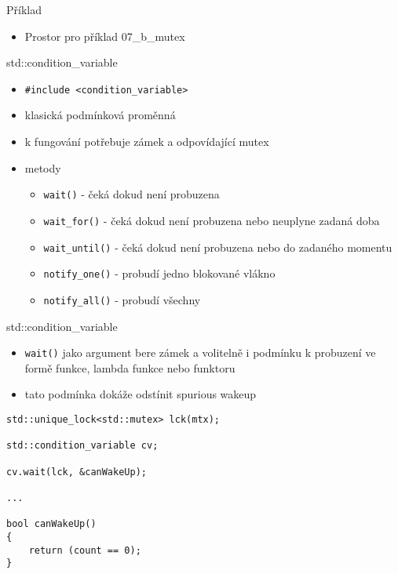 \documentclass{beamer}
\begin{document}
\begin{xframe}{Příklad}
	\begin{itemize}
		\item Prostor pro příklad 07\_b\_mutex
	\end{itemize}
\end{xframe}


\begin{xframe}{std::condition\_variable}
	\begin{itemize}
		\item \texttt{\#include <condition\_variable>}
		\item klasická podmínková proměnná
		\item k fungování potřebuje zámek a odpovídající mutex
		\item metody
			\begin{itemize}
				\item \texttt{wait()} - čeká dokud není probuzena
				\item \texttt{wait\_for()} - čeká dokud není probuzena nebo neuplyne zadaná doba
				\item \texttt{wait\_until()} - čeká dokud není probuzena nebo do zadaného momentu
				\item \texttt{notify\_one()} - probudí jedno blokované vlákno
				\item \texttt{notify\_all()} - probudí všechny
			\end{itemize}
	\end{itemize}
\end{xframe}

\begin{xframe}{std::condition\_variable}
	\begin{itemize}
		\item \texttt{wait()} jako argument bere zámek a volitelně i podmínku k probuzení ve formě funkce, lambda funkce nebo funktoru
		\item tato podmínka dokáže odstínit spurious wakeup
	\end{itemize}
\begin{lstlisting}[basicstyle=\fontsize{8}{9}\selectfont\ttfamily]
std::unique_lock<std::mutex> lck(mtx);

std::condition_variable cv;

cv.wait(lck, &canWakeUp);

...

bool canWakeUp()
{
    return (count == 0);
}
\end{lstlisting}
\end{xframe}
\end{document}
